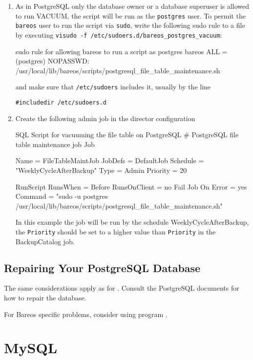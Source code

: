 \begin{enumerate}
\item As in PostgreSQL only the database owner or a database superuser is allowed
to run VACUUM, the script will be run as the \texttt{postgres} user. To permit
the \texttt{bareos} user to run the script via \texttt{sudo}, write the following
sudo rule to a file by executing \texttt{visudo -f /etc/sudoers.d/bareos\_postgres\_vacuum}:
\begin{commands}{sudo rule for allowing bareos to run a script as postgres}
bareos ALL = (postgres) NOPASSWD: /usr/local/lib/bareos/scripts/postgresql_file_table_maintenance.sh
\end{commands}
and make sure that \texttt{/etc/sudoers} includes it, usually by the line
\footnotesize
\begin{verbatim}
#includedir /etc/sudoers.d
\end{verbatim}
\normalsize

\item Create the following admin job in the director configuration
\begin{commands}{SQL Script for vacuuming the file table on PostgreSQL}
# PostgreSQL file table maintenance job
Job {
  Name = FileTableMaintJob
  JobDefs = DefaultJob
  Schedule = "WeeklyCycleAfterBackup"
  Type = Admin
  Priority = 20

  RunScript {
    RunsWhen = Before
    RunsOnClient = no
    Fail Job On Error = yes
    Command = "sudo -u postgres /usr/local/lib/bareos/scripts/postgresql_file_table_maintenance.sh"
  }
}
\end{commands}
In this example the job will be run by the schedule WeeklyCycleAfterBackup,
the \texttt{Priority} should be set to a higher value than \texttt{Priority}
in the BackupCatalog job.
\end{enumerate}


\subsection{Repairing Your PostgreSQL Database}
\label{RepairingPSQL}

The same considerations apply as for .
Consult the PostgreSQL documents for how to repair the database.

For Bareos specific problems, 
consider using  program .




\section{MySQL}



